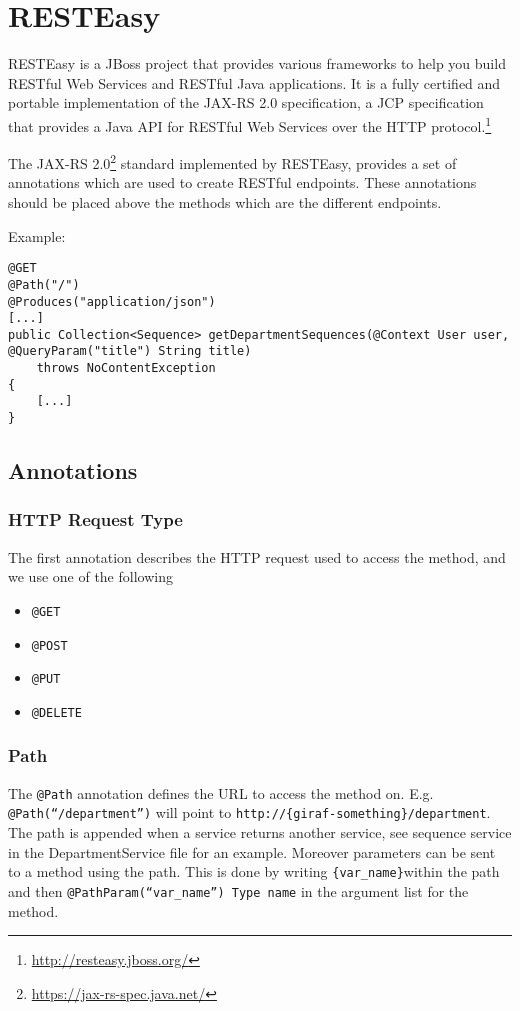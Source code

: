 \newpage
\section{RESTEasy}\label{app:resteasy}
\begin{displayquote}
RESTEasy is a JBoss project that provides various frameworks to help you build RESTful Web Services and RESTful Java applications.
It is a fully certified and portable implementation of the JAX-RS 2.0 specification, a JCP specification that provides a Java API for RESTful Web Services over the HTTP protocol.\footnote{\url{http://resteasy.jboss.org/}}
\end{displayquote}

\noindent
The JAX-RS 2.0\footnote{\url{https://jax-rs-spec.java.net/}} standard implemented by RESTEasy, provides a set of annotations which are used to create RESTful endpoints. These annotations should be placed above the methods which are the different endpoints.

\bigskip\noindent
Example:
\begin{lstlisting}
@GET
@Path("/")
@Produces("application/json")
[...]
public Collection<Sequence> getDepartmentSequences(@Context User user, @QueryParam("title") String title)
    throws NoContentException
{
    [...]
}
\end{lstlisting}

\subsection{Annotations}

\subsubsection{HTTP Request Type}
The first annotation describes the HTTP request used to access the method, and we use one of the following
\begin{itemize}
    \item \texttt{@GET}
    \item \texttt{@POST}
    \item \texttt{@PUT}
    \item \texttt{@DELETE}
\end{itemize}

\subsubsection{Path}
The \texttt{@Path} annotation defines the URL to access the method on. E.g. \texttt{@Path(``/department'')} will point to \texttt{http://\{giraf-something\}/department}.
The path is appended when a service returns another service, see sequence service in the DepartmentService file for an example.
Moreover parameters can be sent to a method using the path. This is done by writing \texttt{\{var\_name\}}within the path and then \texttt{@PathParam(``var\_name'') Type name} in the argument list for the method.

